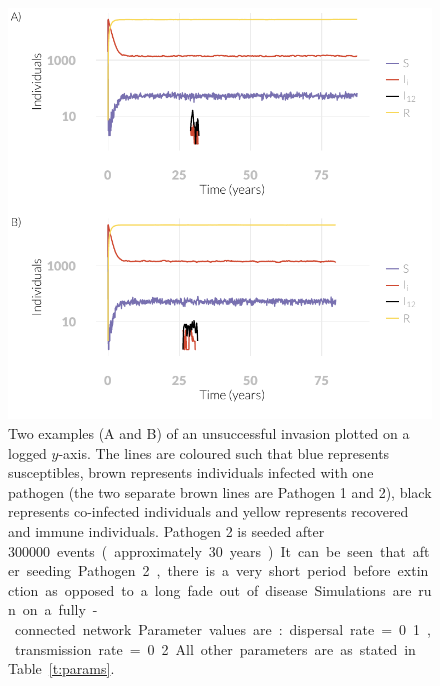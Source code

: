 \begin{knitrout}\footnotesize
{}\color{fgcolor}\begin{figure}[t]

{\centering \includegraphics[width=\textwidth]{figure/A-plotsNoInvade-1} 

}

\caption[
Examples of simulated SIR dynamics with unsuccessfull invasions
]{
Two examples (A and B) of an unsuccessful invasion plotted on a logged $y$-axis.
The lines are coloured such that blue represents susceptibles, brown represents individuals infected with one pathogen (the two separate brown lines are Pathogen 1 and 2), black represents co-infected individuals and yellow represents recovered and immune individuals.
Pathogen 2 is seeded after \SI{300000} events (approximately 30 years).
It can be seen that after seeding Pathogen 2, there is a very short period before extinction as opposed to a long fade out of disease.
Simulations are run on a fully-connected network.
Parameter values are: dispersal rate = 0.1, transmission rate = 0.2.
All other parameters are as stated in Table~\ref{t:params}.
}\label{fig:plotsNoInvade1}
\end{figure}

\begin{figure}[t]


\end{figure}
\end{knitrout}
